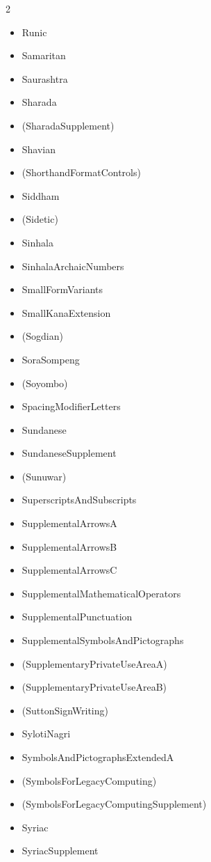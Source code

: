 \documentclass{article}
\newenvironment{itemlist}{%
  \begin{itemize}
  \setlength{\itemsep}{0pt}
  \setlength{\parsep}{0pt}
  \setlength{\topsep}{0pt}
  \setlength{\partopsep}{0pt}
  \setlength{\parskip}{0pt}
  \setlength{\labelsep}{5pt}}%
{
  \end{itemize}}
\begin{document}
\begin{multicols*}{2}
\begin{itemlist}
        \item Runic
        \item Samaritan
        \item Saurashtra
        \item Sharada
        \item (SharadaSupplement)
        \item Shavian
        \item (ShorthandFormatControls)
        \item Siddham
        \item (Sidetic)
        \item Sinhala
        \item SinhalaArchaicNumbers
        \item SmallFormVariants
        \item SmallKanaExtension
        \item (Sogdian)
        \item SoraSompeng
        \item (Soyombo)
        \item SpacingModifierLetters
        \item Sundanese
        \item SundaneseSupplement
        \item (Sunuwar)
        \item SuperscriptsAndSubscripts
        \item SupplementalArrowsA
        \item SupplementalArrowsB
        \item SupplementalArrowsC
        \item SupplementalMathematicalOperators
        \item SupplementalPunctuation
        \item SupplementalSymbolsAndPictographs
        \item (SupplementaryPrivateUseAreaA)
        \item (SupplementaryPrivateUseAreaB)
        \item (SuttonSignWriting)
        \item SylotiNagri
        \item SymbolsAndPictographsExtendedA
        \item (SymbolsForLegacyComputing)
        \item (SymbolsForLegacyComputingSupplement)
        \item Syriac
        \item SyriacSupplement

\end{itemlist}
\end{multicols*}
\end{document}
